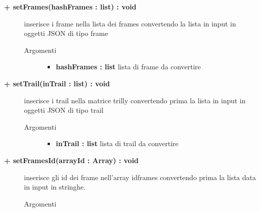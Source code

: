 \begin{description}
	
	\begin{description}
		\item[\textbf{\color{blue}+ setFrames(hashFrames : list) : void			}] \hfill
			inserisce i frame nella lista dei frames convertendo la lista in input in oggetti JSON di tipo frame
			
		\begin{description}
			\item[Argomenti] \hfill
				\begin{itemize}
				
					\item \textbf{hashFrames : list			} \hfill
						lista di frame da convertire
					
				\end{itemize}
		\end{description}
	\end{description}
	
	\begin{description}
		\item[\textbf{\color{blue}+ setTrail(inTrail : list) : void			}] \hfill
			inserisce i trail nella matrice trilly convertendo prima la lista in input in oggetti JSON di tipo trail
			
		\begin{description}
			\item[Argomenti] \hfill
				\begin{itemize}
				
					\item \textbf{inTrail : list			} \hfill
						lista di trail da convertire
					
				\end{itemize}
		\end{description}
	\end{description}
	
	\begin{description}
		\item[\textbf{\color{blue}+ setFramesId(arrayId : Array) : void			}] \hfill
			inserisce gli id dei frame nell'array idframes convertendo prima la lista data in input in stringhe.
			
		\begin{description}
			\item[Argomenti] \hfill
				\begin{itemize}
				

\end{itemize}
\end{description}
\end{description}
\end{description}
